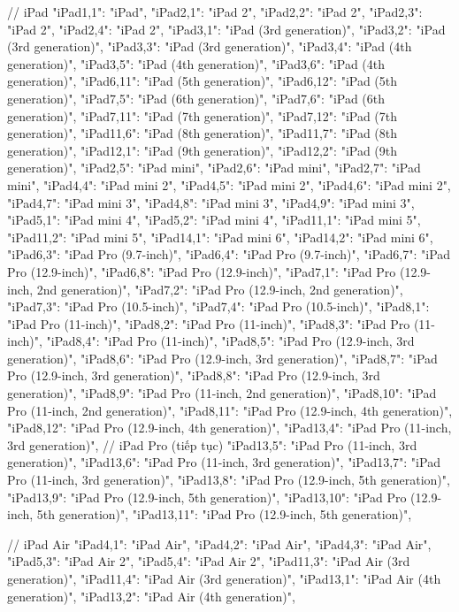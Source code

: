 { // iPad
 "iPad1,1": "iPad",
 "iPad2,1": "iPad 2",
 "iPad2,2": "iPad 2",
 "iPad2,3": "iPad 2",
 "iPad2,4": "iPad 2",
 "iPad3,1": "iPad (3rd generation)",
 "iPad3,2": "iPad (3rd generation)",
 "iPad3,3": "iPad (3rd generation)",
 "iPad3,4": "iPad (4th generation)",
 "iPad3,5": "iPad (4th generation)",
 "iPad3,6": "iPad (4th generation)",
 "iPad6,11": "iPad (5th generation)",
 "iPad6,12": "iPad (5th generation)",
 "iPad7,5": "iPad (6th generation)",
 "iPad7,6": "iPad (6th generation)",
 "iPad7,11": "iPad (7th generation)",
 "iPad7,12": "iPad (7th generation)",
 "iPad11,6": "iPad (8th generation)",
 "iPad11,7": "iPad (8th generation)",
 "iPad12,1": "iPad (9th generation)",
 "iPad12,2": "iPad (9th generation)",
 "iPad2,5": "iPad mini",
 "iPad2,6": "iPad mini",
 "iPad2,7": "iPad mini",
 "iPad4,4": "iPad mini 2",
 "iPad4,5": "iPad mini 2",
 "iPad4,6": "iPad mini 2",
 "iPad4,7": "iPad mini 3",
 "iPad4,8": "iPad mini 3",
 "iPad4,9": "iPad mini 3",
 "iPad5,1": "iPad mini 4",
 "iPad5,2": "iPad mini 4",
 "iPad11,1": "iPad mini 5",
 "iPad11,2": "iPad mini 5",
 "iPad14,1": "iPad mini 6",
 "iPad14,2": "iPad mini 6",
 "iPad6,3": "iPad Pro (9.7-inch)",
 "iPad6,4": "iPad Pro (9.7-inch)",
 "iPad6,7": "iPad Pro (12.9-inch)",
 "iPad6,8": "iPad Pro (12.9-inch)",
 "iPad7,1": "iPad Pro (12.9-inch, 2nd generation)",
 "iPad7,2": "iPad Pro (12.9-inch, 2nd generation)",
 "iPad7,3": "iPad Pro (10.5-inch)",
 "iPad7,4": "iPad Pro (10.5-inch)",
 "iPad8,1": "iPad Pro (11-inch)",
 "iPad8,2": "iPad Pro (11-inch)",
 "iPad8,3": "iPad Pro (11-inch)",
 "iPad8,4": "iPad Pro (11-inch)",
 "iPad8,5": "iPad Pro (12.9-inch, 3rd generation)",
 "iPad8,6": "iPad Pro (12.9-inch, 3rd generation)",
 "iPad8,7": "iPad Pro (12.9-inch, 3rd generation)",
 "iPad8,8": "iPad Pro (12.9-inch, 3rd generation)",
 "iPad8,9": "iPad Pro (11-inch, 2nd generation)",
 "iPad8,10": "iPad Pro (11-inch, 2nd generation)",
 "iPad8,11": "iPad Pro (12.9-inch, 4th generation)",
 "iPad8,12": "iPad Pro (12.9-inch, 4th generation)",
 "iPad13,4": "iPad Pro (11-inch, 3rd generation)",
   // iPad Pro (tiếp tục)
   "iPad13,5": "iPad Pro (11-inch, 3rd generation)",
   "iPad13,6": "iPad Pro (11-inch, 3rd generation)",
   "iPad13,7": "iPad Pro (11-inch, 3rd generation)",
   "iPad13,8": "iPad Pro (12.9-inch, 5th generation)",
   "iPad13,9": "iPad Pro (12.9-inch, 5th generation)",
   "iPad13,10": "iPad Pro (12.9-inch, 5th generation)",
   "iPad13,11": "iPad Pro (12.9-inch, 5th generation)",
   
   // iPad Air
   "iPad4,1": "iPad Air",
   "iPad4,2": "iPad Air",
   "iPad4,3": "iPad Air",
   "iPad5,3": "iPad Air 2",
   "iPad5,4": "iPad Air 2",
   "iPad11,3": "iPad Air (3rd generation)",
   "iPad11,4": "iPad Air (3rd generation)",
   "iPad13,1": "iPad Air (4th generation)",
   "iPad13,2": "iPad Air (4th generation)",
 
}
